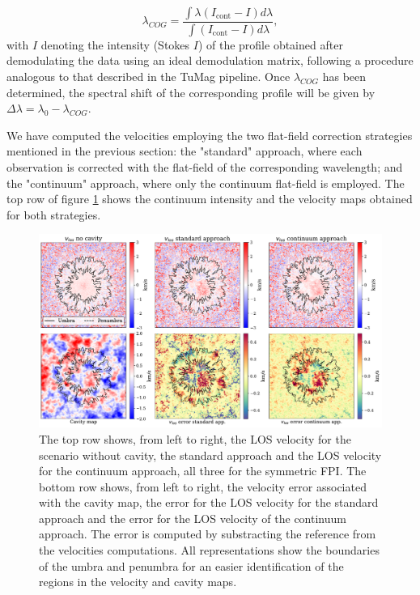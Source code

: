 \begin{equation}
  \lambda _ {COG} = \frac{\int \lambda \left( I _{\text{cont}} - I\right)d\lambda}{\int \left( I _{\text{cont}} - I\right)d\lambda},
\end{equation}
with \(I\) denoting the intensity (Stokes \(I\)) of the profile obtained after demodulating the data using an ideal demodulation matrix, following a procedure analogous to that described in the TuMag pipeline. Once $\lambda _ {COG}$ has been determined, the spectral shift of the corresponding profile will be given by $\Delta \lambda = \lambda _ 0 - \lambda _ {COG}$. 

We have computed the velocities employing the two flat-field correction strategies mentioned in the previous section: the "standard" approach, where each observation is corrected with the flat-field of the corresponding wavelength; and the "continuum" approach, where only the continuum flat-field is employed. The top row of figure \ref{fig_mancha: int_and_vlos_examples} shows the continuum intensity and the velocity maps obtained for both strategies.  

\begin{figure}[t]
  \includegraphics[width=\textwidth]{figures/Mancha/intensity_and_vlos_examples.pdf}
  \caption[Sunspot velocity errors.]{
    The top row shows, from left to right, the LOS velocity for the scenario without cavity, the standard approach and the LOS velocity for the continuum approach, all three for the symmetric FPI. The bottom row shows, from left to right, the velocity error associated with the cavity map, the error for the LOS velocity for the standard approach and the error for the LOS velocity of the continuum approach. The error is computed by substracting the reference from the velocities computations. All representations show the boundaries of the umbra and penumbra for an easier identification of the regions in the velocity and cavity maps.   
    \label{fig_mancha: int_and_vlos_examples}}
\end{figure}

